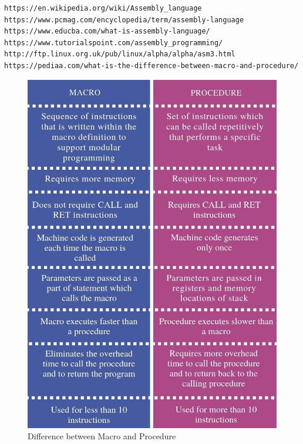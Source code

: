 \documentclass[11pt]{article}
\begin{document}
\begin{lstlisting}
https://en.wikipedia.org/wiki/Assembly_language
https://www.pcmag.com/encyclopedia/term/assembly-language
https://www.educba.com/what-is-assembly-language/
https://www.tutorialspoint.com/assembly_programming/
http://ftp.linux.org.uk/pub/linux/alpha/alpha/asm3.html
https://pediaa.com/what-is-the-difference-between-macro-and-procedure/
\end{lstlisting}
\newpage
\begin{figure}[h!]
        \centering
        \includegraphics[width=14cm]{Macro-vs-Procedure.jpg}
        \caption{Difference between Macro and Procedure}
        \label{fig:vs}
\end{figure}
\end{document}
